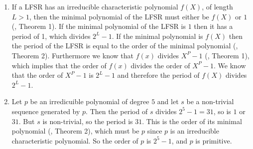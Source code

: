 \begin{enumerate}

\item If a LFSR has an irreducible characteristic polynomial $f(X)$, of length $L > 1$, then the minimal polynomial of the LFSR must either be $f(X)$ or $1$ (\cite{slides}, Theorem 1). If the minimal polynomial of the LFSR is $1$ then it has a period of 1, which divides $2^{L}-1$. If the minimal polynomial is $f(X)$ then the period of the LFSR is equal to the order of the minimal polynomial (\cite{slides}, Theorem 2). Furthermore we know that $f(x)$ divides $X^{P} - 1$ (\cite{slides}, Theorem 1), which implies that the order of $f(x)$ divides the order of $X^{P} - 1$. We know that the order of $X^{P} - 1$ is $2^{L} - 1$ and therefore the period of $f(X)$ divides $2^{L} - 1$.

\item Let $p$ be an irredicuible polynomial of degree $5$ and let $s$ be a non-trivial
sequence generated by $p$. Then the period of $s$ divides $2^5-1=31$, so is $1$ or $31$.
But $s$ is non-trivial, so the period is $31$. This is the order of its minimal polynomial
(\cite{slides}, Theorem 2), which must be $p$ since $p$ is an irreducible characteristic
polynomial. So the order of $p$ is $2^5-1$, and $p$ is primitive.

\end{enumerate}
